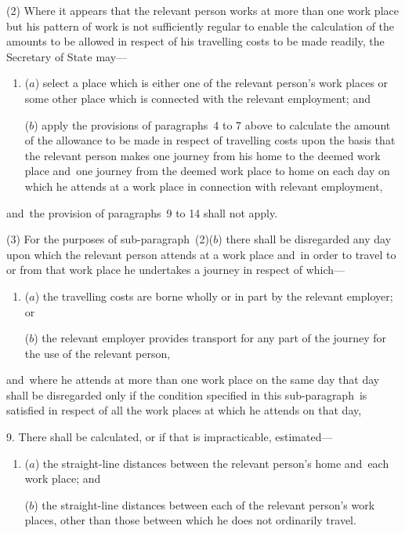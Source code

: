 \documentclass[12pt,a4paper]{article}
\begin{document}
(2) Where it appears that the relevant person works at more than one work place but his pattern of work is not sufficiently regular to enable the calculation of the amounts to be allowed in respect of his travelling costs to be made readily, the 
Secretary of State  %
may—
\begin{enumerate}\item[]
($a$) select a place which is either one of the relevant person’s work places or some other place which is connected with the relevant employment; and

($b$) apply the provisions of paragraphs~4 to 7 above to calculate the amount of the allowance to be made in respect of travelling costs upon the basis that the relevant person makes one journey from his home to the deemed work place and~one journey from the deemed work place to home on each day on which he attends at a work place in connection with relevant employment,
\end{enumerate}
and~the provision of paragraphs~9 to 
14  %
shall not apply.

(3) For the purposes of sub-paragraph~(2)($b$) there shall be disregarded any day upon which the relevant person attends at a work place and~in order to travel to or from that work place he undertakes a journey in respect of which—
\begin{enumerate}\item[]
($a$) the travelling costs are borne wholly or in part by the relevant employer; or

($b$) the relevant employer provides transport for any part of the journey for the use of the relevant person,
\end{enumerate}
and~where he attends at more than one work place on the same day that day shall be disregarded only if the condition specified in this sub-paragraph~is satisfied in respect of all the work places at which he attends on that day,


\medskip

9.  There shall be calculated, or if that is impracticable, estimated—
\begin{enumerate}\item[]
($a$) the straight-line distances between the relevant person’s home and~each work place; and

($b$) the straight-line distances between each of the relevant person’s work places, other than those between which he does not ordinarily travel.
\end{enumerate}
\end{document}
